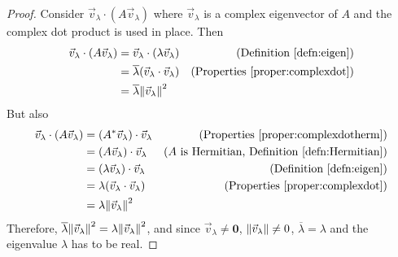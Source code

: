 \begin{proof}
Consider $\vec{v}_\lambda \cdot (A\vec{v}_\lambda)$ where $\vec{v}_\lambda$ is a complex eigenvector of $A$ and the complex dot product is used in place. Then
\begin{align*}
\vec{v}_\lambda \cdot (A\vec{v}_\lambda) &= \vec{v}_\lambda \cdot (\lambda \vec{v}_\lambda) & \text{(Definition \ref{defn:eigen})} \\
&= \overline{\lambda} (\vec{v}_\lambda \cdot \vec{v}_\lambda) & \text{(Properties \ref{proper:complexdot})} \\
&= \overline{\lambda} \norm{\vec{v}_\lambda}^2
\end{align*}
But also
\begin{align*}
\vec{v}_\lambda \cdot (A\vec{v}_\lambda) &= (A^*\vec{v}_\lambda) \cdot \vec{v}_\lambda & \text{(Properties \ref{proper:complexdotherm})} \\
&= (A\vec{v}_\lambda) \cdot \vec{v}_\lambda & \text{($A$ is Hermitian, Definition \ref{defn:Hermitian})} \\
&= (\lambda\vec{v}_\lambda) \cdot \vec{v}_\lambda & \text{(Definition \ref{defn:eigen})} \\
&= \lambda (\vec{v}_\lambda \cdot \vec{v}_\lambda) & \text{(Properties \ref{proper:complexdot})} \\
&= \lambda \norm{\vec{v}_\lambda}^2
\end{align*}
Therefore, $\overline{\lambda}\norm{\vec{v}_\lambda}^2 = \lambda \norm{\vec{v}_\lambda}^2$, and since $\vec{v}_\lambda \neq \textbf{0}$, $\norm{\vec{v}_\lambda} \neq 0$, $\overline{\lambda} = \lambda$ and the eigenvalue $\lambda$ has to be real.
\end{proof}

